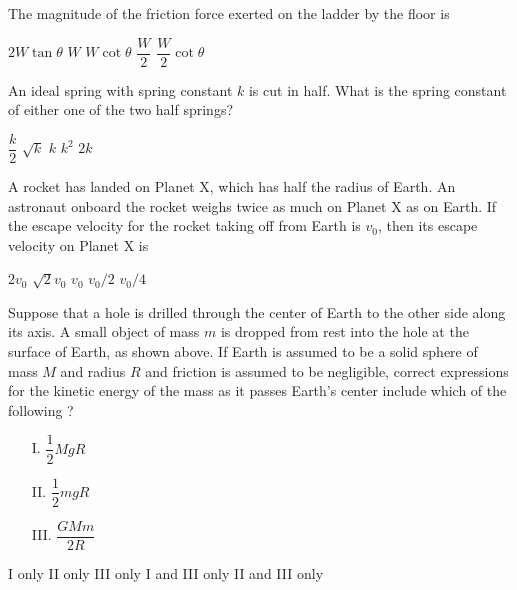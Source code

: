 \documentclass[12pt]{../oss-classkick-exam}
\begin{document}
\begin{questions}
  \question The magnitude of the friction force exerted on the ladder by the
  floor is  
  \begin{choices}
    \choice $2W\tan\theta$
    \choice $W$
    \choice $W\cot\theta$
    \choice $\dfrac W2$
    \choice $\dfrac W2\cot\theta$
  \end{choices}
  \label{ladder2}
  
  \question An ideal spring with spring constant $k$ is cut in half. What is the
  spring constant of either one of the two half springs?
  \begin{choices}
    \choice $\dfrac k2$
    \choice $\sqrt k$
    \choice $k$
    \choice $k^2$
    \choice $2k$
  \end{choices}
  
  \question A rocket has landed on Planet X, which has half the radius of
  Earth. An astronaut onboard the rocket weighs twice as much on Planet X as on
  Earth. If the escape velocity for the rocket taking off from Earth is $v_0$,
  then its escape velocity on Planet X is
  \begin{choices}
    \choice $2v_0$
    \choice $\sqrt2 v_0$
    \choice $v_0$
    \choice $v_0/2$
    \choice $v_0/4$
  \end{choices}
  
  \begin{center}
  \end{center}
  
  \question Suppose that a hole is drilled through the center of Earth to the
  other side along its axis. A small object of mass $m$ is dropped from rest
  into the hole at the surface of Earth, as shown above. If Earth is assumed to
  be a solid sphere of mass $M$ and radius $R$ and friction is assumed to be
  negligible, correct expressions for the kinetic energy of the mass as it
  passes Earth's center include which of the following ?
  \begin{enumerate}[nosep]
  \item[I.] $\dfrac12MgR$
  \item[II.] $\dfrac12mgR$
  \item[III.] $\dfrac{GMm}{2R}$
  \end{enumerate}  
  \begin{choices}
    \choice I only
    \choice II only
    \choice III only
    \choice I and III only
    \choice II and III only
  \end{choices}
\end{questions}
\end{document}
